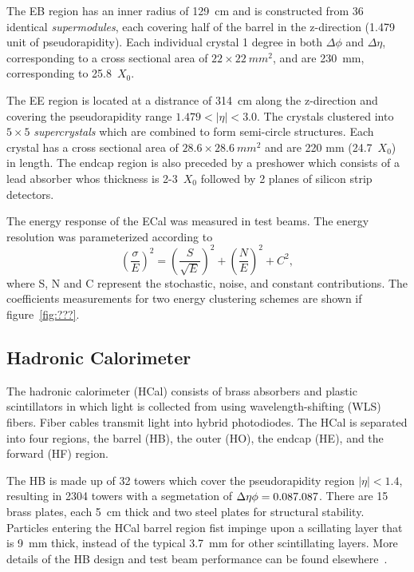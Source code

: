 The EB region has an inner radius of 129~cm and is constructed from 36
identical {\it supermodules}, each covering half of the barrel in the 
z-direction (1.479 unit of pseudorapidity).  Each individual crystal 
1 degree in both $\Delta\phi$ and $\Delta\eta$, corresponding to a cross
sectional area of $22\times22~mm^2$, and are 230~mm, corresponding to 
25.8~$X_0$.

The EE region is located at a distrance of 314~cm along the z-direction
and covering the pseudorapidity range $1.479<|\eta|<3.0$.  The crystals
clustered into $5\times5$ {\it supercrystals} which are combined to form
semi-circle structures.  Each crystal has a cross sectional area of 
$28.6\times28.6~mm^2$ and are 220 mm (24.7~$X_0$) in length.  The endcap 
region is also preceded by a preshower which consists of a lead absorber
whos thickness is 2-3~$X_0$ followed by 2 planes of silicon strip detectors.

The energy response of the ECal was measured in test beams.  The energy 
resolution was parameterized according to
\begin{equation}
\left(\frac{\sigma}{E}\right)^2 = \left(\frac{S}{\sqrt{E}}\right)^2 + \left(\frac{N}{E}\right)^2 + C^2,
\end{equation}
where S, N and C represent the stochastic, noise, and constant contributions.
The coefficients measurements for two energy clustering schemes are shown
if figure~\ref{fig:???}.

\subsection{Hadronic Calorimeter}
\label{sec:HCal}

The hadronic calorimeter (HCal) consists of brass absorbers and plastic 
scintillators
in which light is collected from using wavelength-shifting (WLS) fibers. 
Fiber cables transmit light into hybrid photodiodes.  The HCal is separated
into four regions, the barrel (HB), the outer (HO), the endcap (HE), 
and the forward (HF) region.

The HB is made up of 32 towers which cover the pseudorapidity region 
$|\eta|<1.4$, resulting in 2304 towers with a segmetation of 
$\Delta\eta\time\Delta\phi=0.087\time0.087$.  There are 15 brass plates, 
each 5~cm thick and two steel plates for structural stability. Particles 
entering the HCal barrel region fist impinge upon a scillating layer that
is 9~mm thick, instead of the typical 3.7~mm for other scintillating layers.
More details of the HB design and test beam performance can be found
elsewhere~\cite{??}.

